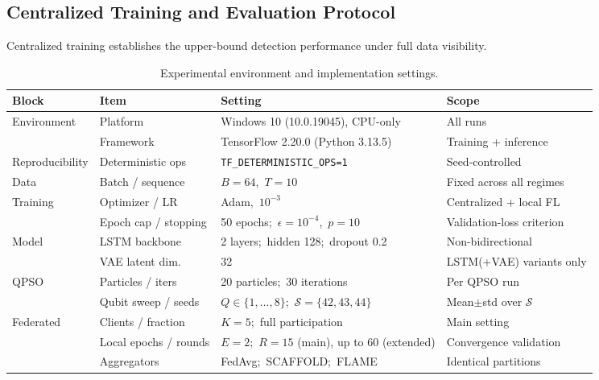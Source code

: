 \documentclass[conference]{IEEEtran}
\begin{document}
\subsection{Centralized Training and Evaluation Protocol}
\label{subsec:centralized_method}
Centralized training establishes the upper-bound detection
performance under full data visibility. 
\begin{table}[!htbp]
\centering
\caption{Experimental environment and implementation settings.}
\label{tab:impl_setup}
\setlength{\tabcolsep}{5pt}
\renewcommand{\arraystretch}{1.10}
\begin{tabular}{llll}
\hline\toprule
\textbf{Block} & \textbf{Item} &
\textbf{Setting} & \textbf{Scope} \\
\hline\toprule
Environment    & Platform            &
  Windows 10 (10.0.19045), CPU-only         &
  All runs \\
               & Framework           &
  TensorFlow 2.20.0 (Python 3.13.5)         &
  Training + inference \\
Reproducibility& Deterministic ops   &
  \texttt{TF\_DETERMINISTIC\_OPS=1}         &
  Seed-controlled \\
\hline
Data           & Batch / sequence    &
  $B=64$,\ $T=10$                           &
  Fixed across all regimes \\
\hline
Training       & Optimizer / LR      &
  Adam,\ $10^{-3}$                          &
  Centralized + local FL \\
               & Epoch cap / stopping&
  50 epochs;\ $\epsilon=10^{-4}$,\ $p=10$  &
  Validation-loss criterion \\
\hline
Model          & LSTM backbone       &
  2 layers;\ hidden 128;\ dropout 0.2       &
  Non-bidirectional \\
               & VAE latent dim.     &
  32                                        &
  LSTM(+VAE) variants only \\
\hline
QPSO           & Particles / iters   &
  20 particles;\ 30 iterations              &
  Per QPSO run \\
               & Qubit sweep / seeds &
  $Q\in\{1,\dots,8\}$;\
  $\mathcal{S}=\{42,43,44\}$               &
  Mean$\pm$std over $\mathcal{S}$ \\
\hline
Federated      & Clients / fraction  &
  $K=5$;\ full participation               &
  Main setting \\
               & Local epochs / rounds&
  $E=2$;\ $R=15$ (main), up to 60 (extended)&
  Convergence validation \\
               & Aggregators         &
  FedAvg;\ SCAFFOLD;\ FLAME                &
  Identical partitions \\
\hline\toprule
\end{tabular}
\end{table}
\end{document}
